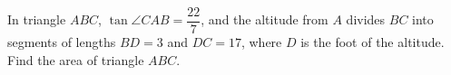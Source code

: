 In triangle $ABC$, $\tan\angle CAB=\dfrac{22}{7}$, and the altitude from $A$ divides $BC$ into segments of lengths $BD=3$ and $DC=17$, where $D$ is the foot of the altitude. Find the area of triangle $ABC$.
